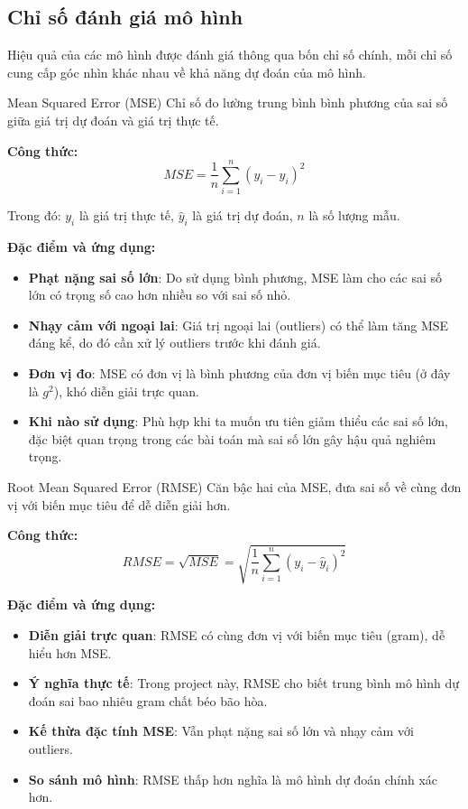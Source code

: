 \documentclass[12pt,a4paper]{article}
\begin{document}
\subsection{Chỉ số đánh giá mô hình}

Hiệu quả của các mô hình được đánh giá thông qua bốn chỉ số chính, mỗi chỉ số cung cấp góc nhìn khác nhau về khả năng dự đoán của mô hình.

\begin{metricsbox}{Mean Squared Error (MSE)}
Chỉ số đo lường trung bình bình phương của sai số giữa giá trị dự đoán và giá trị thực tế.

\vspace{0.2cm}
\textbf{Công thức:}
\[MSE = \frac{1}{n} \sum_{i=1}^{n} (y_i - \hat{y}_i)^2\]

Trong đó: $y_i$ là giá trị thực tế, $\hat{y}_i$ là giá trị dự đoán, $n$ là số lượng mẫu.

\vspace{0.2cm}
\textbf{Đặc điểm và ứng dụng:}
\begin{itemize}
    \item \textbf{Phạt nặng sai số lớn}: Do sử dụng bình phương, MSE làm cho các sai số lớn có trọng số cao hơn nhiều so với sai số nhỏ.
    \item \textbf{Nhạy cảm với ngoại lai}: Giá trị ngoại lai (outliers) có thể làm tăng MSE đáng kể, do đó cần xử lý outliers trước khi đánh giá.
    \item \textbf{Đơn vị đo}: MSE có đơn vị là bình phương của đơn vị biến mục tiêu (ở đây là $g^2$), khó diễn giải trực quan.
    \item \textbf{Khi nào sử dụng}: Phù hợp khi ta muốn ưu tiên giảm thiểu các sai số lớn, đặc biệt quan trọng trong các bài toán mà sai số lớn gây hậu quả nghiêm trọng.
\end{itemize}
\end{metricsbox}

\begin{metricsbox}{Root Mean Squared Error (RMSE)}
Căn bậc hai của MSE, đưa sai số về cùng đơn vị với biến mục tiêu để dễ diễn giải hơn.

\vspace{0.2cm}
\textbf{Công thức:}
\[RMSE = \sqrt{MSE} = \sqrt{\frac{1}{n} \sum_{i=1}^{n} (y_i - \hat{y}_i)^2}\]

\vspace{0.2cm}
\textbf{Đặc điểm và ứng dụng:}
\begin{itemize}
    \item \textbf{Diễn giải trực quan}: RMSE có cùng đơn vị với biến mục tiêu (gram), dễ hiểu hơn MSE.
    \item \textbf{Ý nghĩa thực tế}: Trong project này, RMSE cho biết trung bình mô hình dự đoán sai bao nhiêu gram chất béo bão hòa.
    \item \textbf{Kế thừa đặc tính MSE}: Vẫn phạt nặng sai số lớn và nhạy cảm với outliers.
    \item \textbf{So sánh mô hình}: RMSE thấp hơn nghĩa là mô hình dự đoán chính xác hơn.
\end{itemize}
\end{metricsbox}
\end{document}
